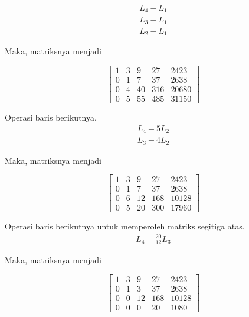 \begin{align*}
	L_4 - L_1 \\
	L_3 - L_1 \\
	L_2 - L_1
\end{align*}

Maka, matriksnya menjadi

\begin{center}
	\setlength\arraycolsep{15pt}
	\[
	\begin{bmatrix}
			1 	& 3 	& 9 	& 27 		& 2423 		\\[1em]
			0 	& 1 	& 7 	& 37 		& 2638		\\[1em]
			0 	& 4 	& 40 	& 316 	& 20680		\\[1em]
			0 	& 5 	& 55 	& 485 	& 31150
	\end{bmatrix}
	\]
\end{center}

Operasi baris berikutnya.
\begin{align*}
	L_4 - 5L_2 \\
	L_3 - 4L_2
\end{align*}

Maka, matriksnya menjadi

\begin{center}
	\setlength\arraycolsep{15pt}
	\[
	\begin{bmatrix}
			1 	& 3 	& 9 	& 27 		& 2423 		\\[1em]
			0 	& 1 	& 7 	& 37 		& 2638		\\[1em]
			0 	& 6 	& 12 	& 168 	& 10128		\\[1em]
			0 	& 5 	& 20 	& 300 	& 17960
	\end{bmatrix}
	\]
\end{center}

Operasi baris berikutnya untuk memperoleh matriks segitiga atas.
\begin{align*}
	L_4 - \frac{20}{12}L_3
\end{align*}

Maka, matriksnya menjadi

\begin{center}
	\setlength\arraycolsep{15pt}
	\[
	\begin{bmatrix}
			1 	& 3 	& 9 	& 27 		& 2423 		\\[1em]
			0 	& 1 	& 3 	& 37 		& 2638		\\[1em]
			0 	& 0 	& 12 	& 168 	& 10128		\\[1em]
			0 	& 0 	& 0 	& 20 		& 1080
	\end{bmatrix}
	\]
\end{center}

